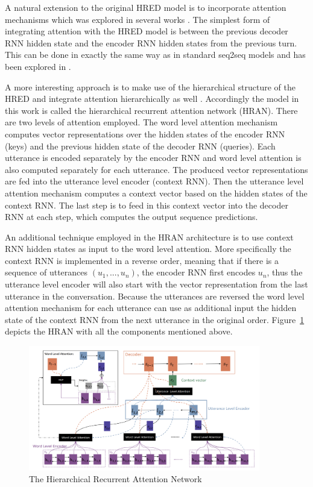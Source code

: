 \documentclass[12pt]{article}
\begin{document}
A natural extension to the original HRED model is to incorporate attention mechanisms which was explored in several works \cite{Yao:2015,Yao:2016,Xing:2017}. The simplest form of integrating attention with the HRED model is between the previous decoder RNN hidden state and the encoder RNN hidden states from the previous turn. This can be done in exactly the same way as in standard seq2seq models and has been explored in \cite{Yao:2015,Yao:2016}.

A more interesting approach is to make use of the hierarchical structure of the HRED and integrate attention hierarchically as well \cite{Xing:2017}. Accordingly the model in this work is called the hierarchical recurrent attention network (HRAN). There are two levels of attention employed. The word level attention mechanism computes vector representations over the hidden states of the encoder RNN (keys) and the previous hidden state of the decoder RNN (queries). Each utterance is encoded separately by the encoder RNN and word level attention is also computed separately for each utterance. The produced vector representations are fed into the utterance level encoder (context RNN). Then the utterance level attention mechanism computes a context vector based on the hidden states of the context RNN. The last step is to feed in this context vector into the decoder RNN at each step, which computes the output sequence predictions. 

An additional technique employed in the HRAN architecture is to use context RNN hidden states as input to the word level attention. More specifically the context RNN is implemented in a reverse order, meaning that if there is a sequence of utterances \((u_1,...,u_n)\), the encoder RNN first encodes \(u_n\), thus the utterance level encoder will also start with the vector representation from the last utterance in the conversation. Because the utterances are reversed the word level attention mechanism for each utterance can use as additional input the hidden state of the context RNN from the next utterance in the original order. Figure~\ref{fig:HRAN} depicts the HRAN with all the components mentioned above.
\begin{figure}[H]
	\centering
	\includegraphics[width=0.9\textwidth]{pics/hran.png}
	\caption{The Hierarchical Recurrent Attention Network \cite{Xing:2017}}
	\label{fig:HRAN}
\end{figure}
\end{document}
